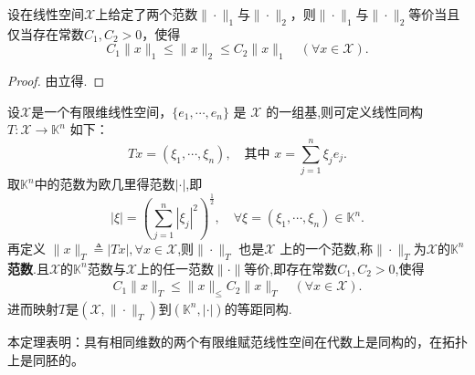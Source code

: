 \documentclass[../../main.tex]{subfiles}%
\begin{document}
\begin{corollary}\label{corollary:范数等价的充要条件}
设在线性空间$\mathscr{X}$上给定了两个范数$\|\cdot\|_1$与$\|\cdot\|_2$，则$\|\cdot\|_1$与$\|\cdot\|_2$等价当且仅当存在常数$C_1,C_2>0$，使得
$$C_1\|x\|_1 \leqslant \|x\|_2 \leqslant C_2\|x\|_1 \quad (\forall x \in \mathscr{X}).$$
\end{corollary}
\begin{proof}

由立得.
\end{proof}

\begin{theorem}\label{theorem:有限维赋范线性空间的范数都等价}
设$\mathscr{X}$是一个有限维线性空间，$\{e_1,\cdots,e_n\}$ 是 $\mathscr{X}$ 的一组基,则可定义线性同构 $T:\mathscr{X}\to\mathbb{K}^n$ 如下：
\[
T x = (\xi_1,\cdots,\xi_n),\quad \text{其中 } x = \sum_{j=1}^n \xi_j e_j.
\]
取$\mathbb{K}^n$中的范数为欧几里得范数$|\cdot|$,即
\[
|\xi| = \left(\sum_{j=1}^n |\xi_j|^2\right)^{\frac{1}{2}},\quad \forall \xi = (\xi_1,\cdots,\xi_n)\in\mathbb{K}^n.
\]
再定义 $\|x\|_T \triangleq |Tx|,\forall x\in \mathscr{X}$,则$\|\cdot\|_T$ 也是$\mathscr{X}$ 上的一个范数,称$\|\cdot\|_T$为$\mathscr{X}$的$\mathbb{K} ^{n}$\textbf{范数}.且$\mathscr{X}$的$\mathbb{K} ^n$范数与$\mathscr{X}$上的任一范数$\|\cdot\|$等价,即存在常数$C_1,C_2>0$,使得
\begin{align*}
C_1\|x\|_T \leqslant \|x\|_ \leqslant C_2\|x\|_T \quad (\forall x \in \mathscr{X}).
\end{align*}
进而映射$T$是$(\mathscr{X},\|\cdot\|_T)$到$(\mathbb{K}^n,|\cdot|)$的等距同构.
\end{theorem}
\begin{remark}
本定理表明：具有相同维数的两个有限维赋范线性空间在代数上是同构的，在拓扑上是同胚的。
\end{remark}
\end{document}
